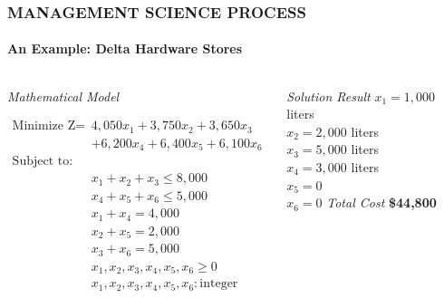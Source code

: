 \documentclass[14 pt]{beamer}
\begin{document}

\begin{frame}[t]
\frametitle{MANAGEMENT SCIENCE PROCESS}
\framesubtitle{An Example: Delta Hardware Stores}

\begin{columns}[t]
\begin{column}{0.45\textwidth}
\emph{Mathematical Model}

\begin{equation*}
\begin{array}{lll}
  \text{Minimize Z}  = & 4,050 x_1 + 3,750 x_2 + 3,650 x_3 \\
                       & + 6,200 x_4 + 6,400 x_5 + 6,100 x_6 \\
  \text{Subject to:}\\
                       & x_1 + x_2 + x_3 \leq 8,000 \\
                       & x_4 + x_5 + x_6 \leq 5,000 \\
                       & x_1 + x_4  = 4,000 \\
                       & x_2 + x_5  = 2,000 \\
                       & x_3 + x_6  = 5,000 \\
                       & x_1, x_2, x_3, x_4, x_5, x_6 \geq 0 \\
                       & x_1, x_2, x_3, x_4, x_5, x_6 : \text{integer}
\end{array}
\end{equation*}
\end{column}

\begin{column}{0.45\textwidth}
\emph{Solution Result}
\vskip0.5cm%
$x_1 = 1,000$  liters\\
$x_2 = 2,000$  liters\\
$x_3 = 5,000$  liters\\
$x_4 = 3,000$  liters\\
$x_5 = 0$\\
$x_6 = 0$
\vskip0.5cm%
\emph{Total Cost}
\vskip0.5cm%
\textbf{\$44,800}
\end{column}
\end{columns}
\end{frame}

\end{document}
